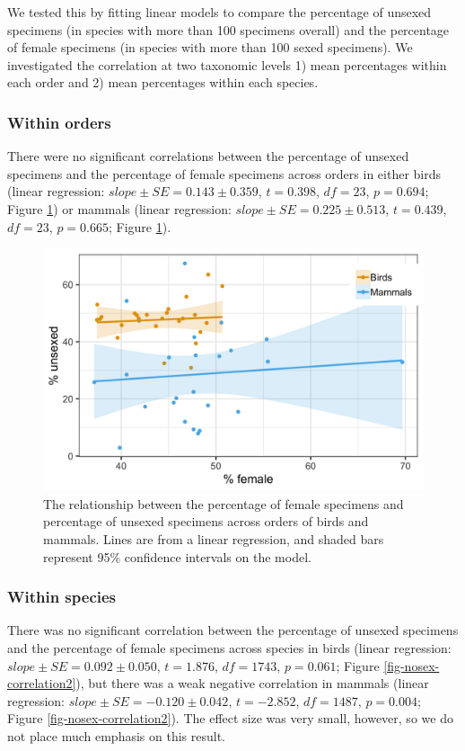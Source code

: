 \documentclass[a4paper, 12pt]{article}
\begin{document}
We tested this by fitting linear models to compare the percentage of unsexed specimens (in species with more than 100 specimens overall) and the percentage of female specimens (in species with more than 100 sexed specimens). 
We investigated the correlation at two taxonomic levels 1) mean percentages within each order and 2) mean percentages within each species.

\subsubsection*{Within orders}
There were no significant correlations between the percentage of unsexed specimens and the percentage of female specimens across orders in either birds (linear regression: $slope ± SE = 0.143 \pm 0.359$, $t = 0.398$, $df = 23$, $p = 0.694$; Figure \ref{fig-nosex-correlation}) or mammals (linear regression: $slope \pm SE = 0.225 \pm 0.513$, $t = 0.439$, $df = 23$, $p = 0.665$; Figure \ref{fig-nosex-correlation}). 

\begin{figure}[H]
 \centering
  \includegraphics[width = \linewidth]{figures/nosex-correlation.png}
  \caption{The relationship between the percentage of female specimens and percentage of unsexed specimens across orders of birds and mammals. 
  Lines are from a linear regression, and shaded bars represent 95\% confidence intervals on the model.}
  \label{fig-nosex-correlation}
\end{figure}

\subsubsection*{Within species}
There was no significant correlation between the percentage of unsexed specimens and the percentage of female specimens across species in birds (linear regression: $slope \pm SE = 0.092 \pm 0.050$, $t = 1.876$, $df = 1743$, $p = 0.061$; Figure \ref{fig-nosex-correlation2}), but there was a weak negative correlation in mammals (linear regression: $slope \pm SE = -0.120 \pm 0.042$, $t = -2.852$, $df = 1487$, $p = 0.004$; Figure \ref{fig-nosex-correlation2}). 
The effect size was very small, however, so we do not place much emphasis on this result.
\end{document}
